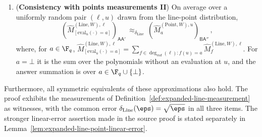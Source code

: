 \begin{lemma}
\begin{enumerate}
\[		\]
		where the answer summation is over $f \in \deg_{md}(\ell)$.
		\item \label{eq:qld-comm-line-pt-cons2}
		(\textbf{Consistency with points measurements II}) On average over
		a uniformly random pair $(\ell,u)$ drawn from the line-point
		distribution,
		\[
			(\hat{M}^{(\mathrm{Line},W),\ell}_{[\mathrm{eval}_u(\cdot)=a]})_{\mathsf{A}\mathsf{A}'}
			\,\approx_{\delta_{\mathrm{Line}}}\,
			(\hat{M}^{(\mathrm{Point},W),u}_a)_{\mathsf{B}\mathsf{A}''}\,,
		\]
		where, for $a \in \F_q$,
		$\hat{M}^{(\mathrm{Line},W),\ell}_{[\mathrm{eval}_u(\cdot)=a]} = \sum_{f \in \deg_{md}(\ell) \colon f(u)=a} \hat{M}^{(\mathrm{Line},W),\ell}_f$.
		For $a=\bot$ it is the sum over the polynomials without an evaluation
		at $u$, and the answer summation is over
		$a \in \F_q \cup \{\bot\}$.
	\end{enumerate}
	Furthermore, all symmetric equivalents of these approximations also
	hold. The proof exhibits the measurements of
	Definition~\ref{def:expanded-line-measurement} as witnesses, with the
	common error $\delta_{\mathrm{Line}}(\eps) = \sqrt{\eps}$ in all three
	items. The stronger linear-error assertion made in the source proof is
	stated separately in Lemma~\ref{lem:expanded-line-point-linear-error}.
\end{lemma}

